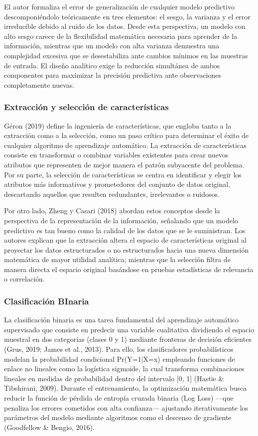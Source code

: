 \documentclass[11pt,oneside,openany]{book}
\begin{document}
El autor formaliza el error de generalización de cualquier modelo predictivo descomponiéndolo teóricamente en tres elementos: el sesgo, la varianza y el error irreducible debido al ruido de los datos. Desde esta perspectiva, un modelo con alto sesgo carece de la flexibilidad matemática necesaria para aprender de la información, mientras que un modelo con alta varianza demuestra una complejidad excesiva que se desestabiliza ante cambios mínimos en las muestras de entrada. El diseño analítico exige la reducción simultánea de ambos componentes para maximizar la precisión predictiva ante observaciones completamente nuevas.

\subsubsection*{Extracción y selección de características}

Géron (2019) define la ingeniería de características, que engloba tanto a la extracción como a la selección, como un paso crítico para determinar el éxito de cualquier algoritmo de aprendizaje automático. La extracción de características consiste en transformar o combinar variables existentes para crear nuevos atributos que representen de mejor manera el patrón subyacente del problema. Por su parte, la selección de características se centra en identificar y elegir los atributos más informativos y prometedores del conjunto de datos original, descartando aquellos que resulten redundantes, irrelevantes o ruidosos.

Por otro lado, Zheng y Casari (2018) abordan estos conceptos desde la perspectiva de la representación de la información, señalando que un modelo predictivo es tan bueno como la calidad de los datos que se le suministran. Los autores explican que la extracción altera el espacio de características original al proyectar los datos estructurados o no estructurados hacia una nueva dimensión matemática de mayor utilidad analítica; mientras que la selección filtra de manera directa el espacio original basándose en pruebas estadísticas de relevancia o correlación.

\subsubsection*{Clasificación BInaria}

La clasificación binaria es una tarea fundamental del aprendizaje automático supervisado que consiste en predecir una variable cualitativa dividiendo el espacio muestral en dos categorías (clases 0 y 1) mediante fronteras de decisión eficientes (Grus, 2019; James et al., 2013). Para ello, los clasificadores probabilísticos modelan la probabilidad condicional Pr(Y=1|X=x) empleando funciones de enlace no lineales como la logística sigmoide, la cual transforma combinaciones lineales en medidas de probabilidad dentro del intervalo [0, 1] (Hastie \& Tibshirani, 2009). Durante el entrenamiento, la optimización matemática busca reducir la función de pérdida de entropía cruzada binaria (Log Loss) ---que penaliza los errores cometidos con alta confianza--- ajustando iterativamente los parámetros del modelo mediante algoritmos como el descenso de gradiente (Goodfellow \& Bengio, 2016).
\end{document}
